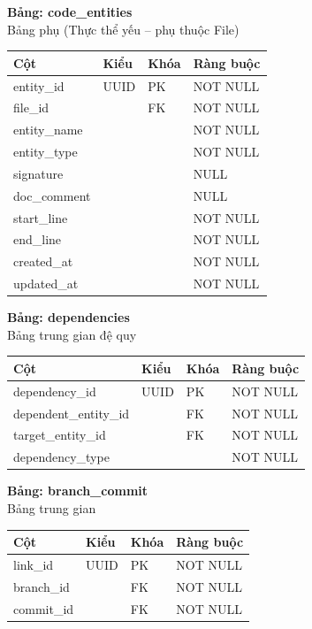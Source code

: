 \textbf{Bảng: code\_entities}\\
Bảng phụ (Thực thể yếu – phụ thuộc File)
\begin{table}[H]
\centering
\begin{tabular}{|l|l|l|l|}
\hline
\textbf{Cột} & \textbf{Kiểu} & \textbf{Khóa} & \textbf{Ràng buộc} \\ \hline
entity\_id & UUID & PK & NOT NULL \\ \hline
file\_id & & FK & NOT NULL \\ \hline
entity\_name & & & NOT NULL \\ \hline
entity\_type & & & NOT NULL \\ \hline
signature & & & NULL \\ \hline
doc\_comment & & & NULL \\ \hline
start\_line & & & NOT NULL \\ \hline
end\_line & & & NOT NULL \\ \hline
created\_at & & & NOT NULL \\ \hline
updated\_at & & & NOT NULL \\ \hline
\end{tabular}
\end{table}

\textbf{Bảng: dependencies}\\
Bảng trung gian đệ quy
\begin{table}[H]
\centering
\begin{tabular}{|l|l|l|l|}
\hline
\textbf{Cột} & \textbf{Kiểu} & \textbf{Khóa} & \textbf{Ràng buộc} \\ \hline
dependency\_id & UUID & PK & NOT NULL \\ \hline
dependent\_entity\_id & & FK & NOT NULL \\ \hline
target\_entity\_id & & FK & NOT NULL \\ \hline
dependency\_type & & & NOT NULL \\ \hline
\end{tabular}
\end{table}

\textbf{Bảng: branch\_commit}\\
Bảng trung gian
\begin{table}[H]
\centering
\begin{tabular}{|l|l|l|l|}
\hline
\textbf{Cột} & \textbf{Kiểu} & \textbf{Khóa} & \textbf{Ràng buộc} \\ \hline
link\_id & UUID & PK & NOT NULL \\ \hline
branch\_id & & FK & NOT NULL \\ \hline
commit\_id & & FK & NOT NULL \\ \hline
\end{tabular}
\end{table}

